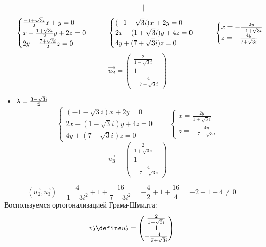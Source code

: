 \begin{itemize}
\begin{multline*}
\begin{vmatrix}
        \end{vmatrix}
    \end{multline*}
    $$
    \begin{cases}
    	\half[-1 + \sqrt3i]x + y = 0 \\
        x + \half[1 + \sqrt3i]y + 2z = 0 \\
        2y + \half[7 + \sqrt3i]z = 0
    \end{cases} \qquad
    \begin{cases}
    	(-1 + \sqrt3i)x + 2y = 0 \\
        2x + (1 + \sqrt3i)y + 4z = 0 \\
        4y + (7 + \sqrt3i)z = 0
    \end{cases} \qquad
    \begin{cases}
        x = -\frac{2y}{-1 + \sqrt3i} \\
        z = -\frac{4y}{7 + \sqrt3i}
    \end{cases} $$
    $$ \vec{u_2} =
    \begin{pmatrix}
        \frac2{1 - \sqrt3i} \\
        1 \\
        -\frac4{7 + \sqrt3i}
    \end{pmatrix} $$
    \item $ \lambda = \half[3 - \sqrt3i] $
    $$
    \begin{cases}
    	(-1 - \sqrt3i)x + 2y = 0 \\
        2x + (1 - \sqrt3i)y + 4z = 0 \\
        4y + (7 - \sqrt3i)z = 0
    \end{cases} \qquad
    \begin{cases}
        x = \frac{2y}{1 + \sqrt3i} \\
        z = -\frac{4y}{7 - \sqrt3i}
    \end{cases} $$
    $$ \vec{u_3} =
    \begin{pmatrix}
        \frac2{1 + \sqrt3i} \\
        1 \\
        -\frac4{7 - \sqrt3i}
    \end{pmatrix} $$
\end{itemize}
$$ (\vec{u_2}, \vec{u_3}) = \frac4{1 - 3i^2} + 1 + \frac{16}{7 - 3i^2} = -\frac42 + 1 + \frac{16}4 = -2 + 1 + 4 \ne 0 $$
Воспользуемся ортогонализацией Грама-Шмидта:
$$ \vec{v_2} \define \vec{u_2} =
\begin{pmatrix}
	\frac2{1 - \sqrt3i} \\
    1 \\
    -\frac4{7 + \sqrt3i}
\end{pmatrix} $$
